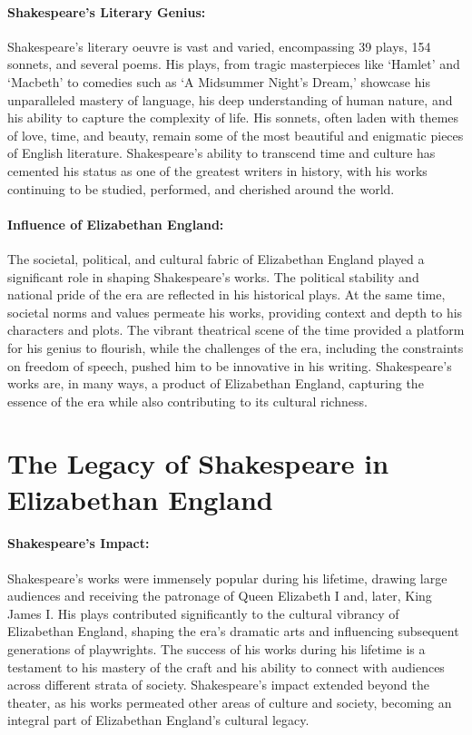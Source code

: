 \documentclass[a4paper,12pt]{book}
\begin{document}
\paragraph{Shakespeare’s Literary Genius:}
Shakespeare’s literary oeuvre is vast and varied, encompassing 39 plays, 154 sonnets, and several poems. His plays, from tragic masterpieces like ‘Hamlet’ and ‘Macbeth’ to comedies such as ‘A Midsummer Night’s Dream,’ showcase his unparalleled mastery of language, his deep understanding of human nature, and his ability to capture the complexity of life. His sonnets, often laden with themes of love, time, and beauty, remain some of the most beautiful and enigmatic pieces of English literature. Shakespeare’s ability to transcend time and culture has cemented his status as one of the greatest writers in history, with his works continuing to be studied, performed, and cherished around the world.

\paragraph{Influence of Elizabethan England:}
The societal, political, and cultural fabric of Elizabethan England played a significant role in shaping Shakespeare’s works. The political stability and national pride of the era are reflected in his historical plays. At the same time, societal norms and values permeate his works, providing context and depth to his characters and plots. The vibrant theatrical scene of the time provided a platform for his genius to flourish, while the challenges of the era, including the constraints on freedom of speech, pushed him to be innovative in his writing. Shakespeare’s works are, in many ways, a product of Elizabethan England, capturing the essence of the era while also contributing to its cultural richness.

\section*{The Legacy of Shakespeare in Elizabethan England}

\paragraph{Shakespeare’s Impact:}
Shakespeare’s works were immensely popular during his lifetime, drawing large audiences and receiving the patronage of Queen Elizabeth I and, later, King James I. His plays contributed significantly to the cultural vibrancy of Elizabethan England, shaping the era’s dramatic arts and influencing subsequent generations of playwrights. The success of his works during his lifetime is a testament to his mastery of the craft and his ability to connect with audiences across different strata of society. Shakespeare’s impact extended beyond the theater, as his works permeated other areas of culture and society, becoming an integral part of Elizabethan England’s cultural legacy.
\end{document}
